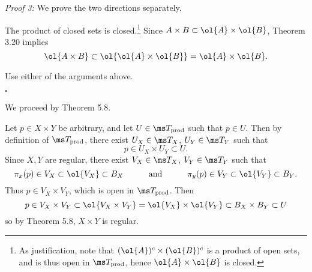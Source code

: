 \documentclass{fkpset}
\newcommand{\tprod}{\ensuremath \ms T_{\rm prod}}
\begin{document}
\begin{solution}
\begin{leftbar}
\begin{adjustwidth}{.025\linewidth}{.025\linewidth}
\begin{boxedminipage}{\linewidth}
        \end{boxedminipage}
      \end{adjustwidth}
      \begin{adjustwidth}{.025\linewidth}{.025\linewidth}
        \color{Magenta}
        \begin{boxedminipage}{\linewidth}
          \emph{Proof 3:} We prove the two directions separately.
          \begin{seteqproof}
            \item The product of closed sets is closed.\footnote{As
                justification, note that $(\ol{A})^c \times
                (\ol{B})^c$ is a product of open sets, and is thus
                open in $\tprod$, hence $\ol{A} \times \ol{B}$ is
                closed.} Since $A \times B \subset \ol{A} \times
              \ol{B}$, Theorem 3.20 implies
              \[
                \ol{A \times B} \subset \ol{\ol{A} \times \ol{B}} =
                \ol{A} \times \ol{B}.
              \]
            \item Use either of the arguments above.
          \end{seteqproof}
          \hfill $\square$
        \end{boxedminipage}
      \end{adjustwidth}
    \end{leftbar}
    We proceed by Theorem 5.8.

    Let $p \in X \times Y$ be arbitrary, and let $U \in \ms T_{\rm
      prod}$ such that $p \in U$. Then by definition of $\ms T_{\rm
      prod}$, there exist $U_X \in \ms T_X$, $U_Y \in \ms T_Y$ such
    that
    \[
      p \in U_X \times U_Y \subset U.
    \]
    Since $X,Y$ are regular, there exist $V_X \in \ms T_X$, $V_Y \in
    \ms T_Y$ such that
    \[
      \pi_x(p) \in V_X \subset \ol{V_X} \subset B_X \qquad\quad
      \text{and} \quad\qquad \pi_y(p) \in V_Y \subset \ol{V_Y} \subset
      B_Y.
    \]
    Thus $p \in V_X \times V_Y$, which is open in $\tprod$. Then
    \[
      p \in V_X \times V_Y \subset \ol{V_X \times V_Y} = \ol{V_X}
      \times \ol{V_Y} \subset B_X \times B_Y \subset U
    \]
    so by Theorem 5.8, $X \times Y$ is regular.
  \end{solution}
  \clearpage
\end{document}
